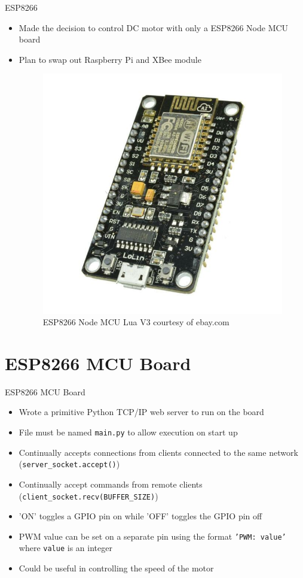 \documentclass{beamer}
\begin{document}
\begin{frame}{ESP8266}{}
\begin{itemize}
\item Made the decision to control DC motor with only a ESP8266 Node MCU board
\item Plan to swap out Raspberry Pi and XBee module
\begin{figure}
\includegraphics[scale=0.89]{../figs/img/esp8266NodeMCU}
\caption{ESP8266 Node MCU Lua V3 courtesy of ebay.com}
\end{figure}
\end{itemize}
\end{frame}

\section{ESP8266 MCU Board}
\begin{frame}{ESP8266 MCU Board}{}
\begin{itemize}
\item Wrote a primitive Python TCP/IP web server to run on the board
\item File must be named \texttt{main.py} to allow execution on start up
\item Continually accepts connections from clients connected to the same network (\texttt{server\_socket.accept()})
\item Continually accept commands from remote clients (\texttt{client\_socket.recv(BUFFER\_SIZE)})
\item 'ON' toggles a GPIO pin on while 'OFF' toggles the GPIO pin off
\item PWM value can be set on a separate pin using the format \texttt{'PWM: value'} where \texttt{value} is an integer
\item Could be useful in controlling the speed of the motor
\end{itemize}
\end{frame}
\end{document}
